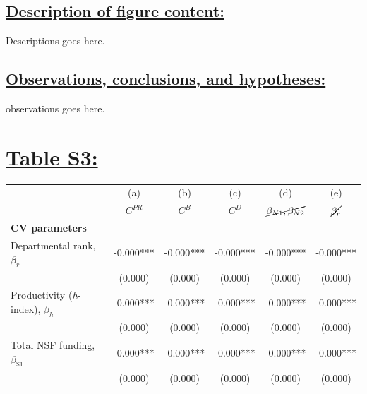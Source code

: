 \documentclass{article}\usepackage[]{graphicx}\usepackage[]{color}
\begin{document}
\subsection*{\underline{Description of figure content:}}
\par{
Descriptions goes here.
}
\subsection*{\underline{Observations, conclusions, and hypotheses:}}
\par{
observations goes here.
}

\newpage
\section*{\underline{Table S3:}}
\begin{table}[h!]
  \begin{center}
  \label{tab:table1}
  \begin{tabular}{l c c c c c}
  
    \hline
    \hline
    
    {} & {(a)} & {(b)} & {(c)} & {(d)} & {(e)}  \\
    {} & {$C^{PR}$} & {$C^{B}$} & {$C^{D}$} & {$\cancel{\beta_{N1},\beta_{N2}}$} & {$\cancel{\beta_{r}}$}  \\
    
    \hline
    
    \textbf {CV parameters}\\
    
    \rowcolor{gray!50}
    Departmental rank, $\beta_{r}$ 
    & -0.000*** & -0.000***  & -0.000*** & -0.000*** & -0.000*** \\
    {} 
    & (0.000)   & (0.000)    & (0.000)   & (0.000)   & (0.000) \\
    
    \rowcolor{gray!50}
    Productivity (\textit{h}-index), $\beta_{h}$ 
    & -0.000*** & -0.000***  & -0.000*** & -0.000*** & -0.000*** \\
    {} 
    & (0.000)   & (0.000)    & (0.000)   & (0.000)   & (0.000) \\
    
    \rowcolor{gray!50}
    Total NSF funding, $\beta_{\$1}$ 
    & -0.000*** & -0.000***  & -0.000*** & -0.000*** & -0.000*** \\
    {} 
    & (0.000)   & (0.000)    & (0.000)   & (0.000)   & (0.000) \\
    

\end{tabular}
\end{center}
\end{table}
\end{document}
